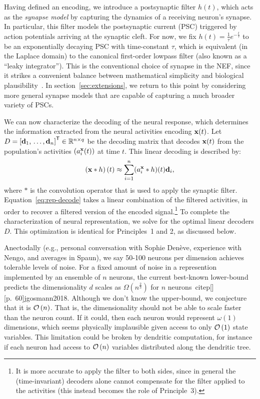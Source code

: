 Having defined an encoding, we introduce a postsynaptic filter $h(t)$, which acts as the \emph{synapse model} by capturing the dynamics of a receiving neuron's synapse.
In particular, this filter models the postsynaptic current (PSC) triggered by action potentials arriving at the synaptic cleft.
For now, we fix $h(t) = \frac{1}{\tau} e^{-\frac{t}{\tau}}$ to be an exponentially decaying PSC with time-constant $\tau$, which is equivalent (in the Laplace domain) to the canonical first-order lowpass filter (also known as a ``leaky integrator'').
This is the conventional choice of synapse in the NEF, since it strikes a convenient balance between mathematical simplicity and biological plausibility~\citep{eliasmith2003a}.
In section~\ref{sec:extensions}, we return to this point by considering more general synapse models that are capable of capturing a much broader variety of PSCs.

We can now characterize the decoding of the neural response, which determines the information extracted from the neural activities encoding $\mathbf{x}(t)$.
Let $D = {\left[ \mathbf{d}_1\text{,}\, \ldots\text{,}\, \mathbf{d}_n \right]}^\mathsf{T} \in \mathbb{R}^{n \times q}$ be the decoding matrix that decodes $\mathbf{x}(t)$ from the population's activities $\left( a_i^{\mathbf{x}}(t) \right)$ at time $t$.
This linear decoding is described by:
\begin{equation} \label{eq:rep-decode}
\left(\mathbf{x} \ast h \right)(t) \approx \sum_{i=1}^n (a_i^{\mathbf{x}} \ast h)(t) \mathbf{d}_i \text{,}
\end{equation}
where $\ast$ is the convolution operator that is used to apply the synaptic filter.
Equation~\ref{eq:rep-decode} takes a linear combination of the filtered activities, in order to recover a filtered version of the encoded signal.\footnote{It is more accurate to apply the filter to both sides, since in general the (time-invariant) decoders alone cannot compensate for the filter applied to the activities (this instead becomes the role of Principle~3).}
To complete the characterization of neural representation, we solve for the optimal linear decoders $D$.
This optimization is identical for Principles~1 and 2, as discussed below.


Anectodally (e.g., personal conversation with Sophie Den\`eve, experience with Nengo, and averages in Spaun), we say 50-100 neurons per dimension achieves tolerable levels of noise.
For a fixed amount of noise in a represention implemented by an ensemble of $n$ neurons, the current best-known lower-bound predicts the dimensionality $d$ scales as $\Omega \left( n^{\frac{2}{3}} \right)$ for $n$ neurons~citep[][p.~60]{jgosmann2018}.
Although we don't know the upper-bound, we conjecture that it is $\mathcal{O}\left({n}\right)$.
That is, the dimensionality should not be able to scale faster than the neuron count.
If it could, then each neuron would represent $\omega(1)$ dimensions, which seems physically implausible given access to only $\mathcal{O}\left({1}\right)$ state variables.
This limitation could be broken by dendritic computation, for instance if each neuron had access to $\mathcal{O}\left({n}\right)$ variables distributed along the dendritic tree.

